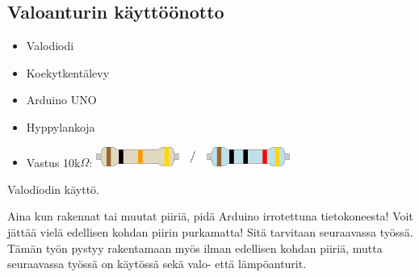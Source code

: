 \subsection{Valoanturin käyttöönotto}
\begin{minipage}{0.5\textwidth}
\begin{tcolorbox}[colback=lime!10,title=Tarvikkeet, colbacktitle=green!10,coltitle=black]
\begin{itemize}
    \item Valodiodi 
    \item Koekytkentälevy
    \item Arduino UNO 
    \item Hyppylankoja
    \item Vastus 10k$\Omega$: \includegraphics[width=0.5\textwidth]{kuvat/10k.pdf}
\end{itemize}
\end{tcolorbox}
\end{minipage}
\begin{minipage}{0.5\textwidth}
\begin{tcolorbox}[colback=blue!10,title=Piirin toiminta,colbacktitle=purple!90]
Valodiodin käyttö.
\tcblower
\begin{center}
\end{center}
\end{tcolorbox}
\end{minipage}

\begin{tcolorbox}[colback=red!10,colbacktitle=red,title=HUOM!]
Aina kun rakennat tai muutat piiriä, pidä Arduino irrotettuna tietokoneesta! 
\tcblower
Voit jättää vielä edellisen kohdan piirin purkamatta! Sitä tarvitaan seuraavassa työssä. Tämän työn pystyy rakentamaan myös ilman edellisen kohdan piiriä, mutta seuraavassa työssä on käytössä sekä valo- että lämpöanturit.
\end{tcolorbox}

